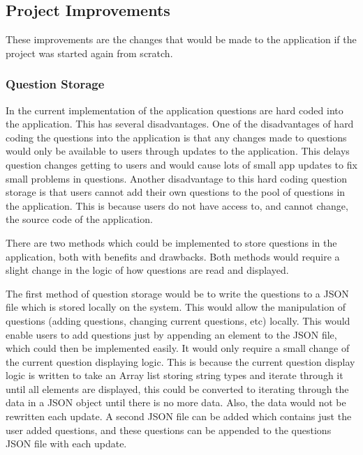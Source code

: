 \documentclass{article}
\begin{document}
\subsection{Project Improvements}

These improvements are the changes that would be made to the application if the project was started again from scratch.

\subsubsection{Question Storage}

In the current implementation of the application questions are hard coded into the application. This has several disadvantages. One of the disadvantages of hard coding the questions into the application is that any changes made to questions would only be available to users through updates to the application. This delays question changes getting to users and would cause lots of small app updates to fix small problems in questions. Another disadvantage to this hard coding question storage is that users cannot add their own questions to the pool of questions in the application. This is because users do not have access to, and cannot change, the source code of the application. \par

There are two methods which could be implemented to store questions in the application, both with benefits and drawbacks. Both methods would require a slight change in the logic of how questions are read and displayed. \par

The first method of question storage would be to write the questions to a JSON file which is stored locally on the system. This would allow the manipulation of questions (adding questions, changing current questions, etc) locally. This would enable users to add questions just by appending an element to the JSON file, which could then be implemented easily. It would only require a small change of the current question displaying logic. This is because the current question display logic is written to take an Array list storing string types and iterate through it until all elements are displayed, this could be converted to iterating through the data in a JSON object until there is no more data. Also, the data would not be rewritten each update. A second JSON file can be added which contains just the user added questions, and these questions can be appended to the questions JSON file with each update. \par
\end{document}
